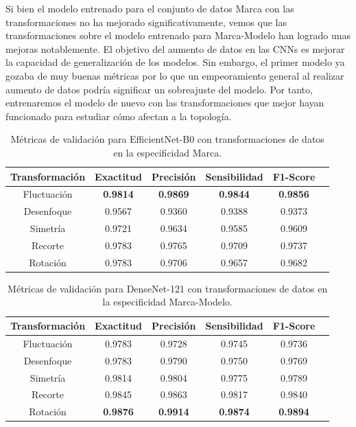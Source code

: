 Si bien el modelo entrenado para el conjunto de datos Marca con las transformaciones no ha mejorado significativamente, vemos que las transformaciones sobre el modelo entrenado para Marca-Modelo han logrado unas mejoras notablemente. El objetivo del aumento de datos en las CNNs es mejorar la capacidad de generalización de los modelos. Sin embargo, el primer modelo ya gozaba de muy buenas métricas por lo que un empeoramiento general al realizar aumento de datos podría significar un sobreajuste del modelo. Por tanto, entrenaremos el modelo de nuevo con las transformaciones que mejor hayan funcionado para estudiar cómo afectan a la topología.

\begin{table}[H]
	\centering
	\begin{adjustbox}{width=0.8\textwidth}
	\begin{tabular}{|c|c|c|c|c|c|}
		\hline
		\textbf{Transformación} & \textbf{Exactitud} & \textbf{Precisión} & \textbf{Sensibilidad} & \textbf{F1-Score} \\
		\hline
		Fluctuación & \textbf{0.9814} & \textbf{0.9869} & \textbf{0.9844} & \textbf{0.9856} \\
		\hline
		Desenfoque & 0.9567 & 0.9360 & 0.9388 & 0.9373 \\
		\hline
		Simetría & 0.9721 & 0.9634 & 0.9585 & 0.9609 \\
		\hline
		Recorte & 0.9783 & 0.9765 & 0.9709 & 0.9737 \\
		\hline
		Rotación & 0.9783 & 0.9706 & 0.9657 & 0.9682 \\
		\hline
	\end{tabular}
\end{adjustbox}
\caption{Métricas de validación para EfficientNet-B0 con transformaciones de datos en la especificidad Marca.}
\label{tab:transformation_metrics-m}
\end{table}

\begin{table}[H]
	\centering
	\begin{adjustbox}{width=0.8\textwidth}
	\begin{tabular}{|c|c|c|c|c|c|}
		\hline
		\textbf{Transformación} & \textbf{Exactitud} & \textbf{Precisión} & \textbf{Sensibilidad} & \textbf{F1-Score} \\
		\hline
		Fluctuación & 0.9783 & 0.9728 & 0.9745 & 0.9736 \\
		\hline
		Desenfoque & 0.9783 & 0.9790 & 0.9750 & 0.9769 \\
		\hline
		Simetría & 0.9814 & 0.9804 & 0.9775 & 0.9789 \\
		\hline
		Recorte & 0.9845 & 0.9863 & 0.9817 & 0.9840 \\
		\hline
		Rotación & \textbf{0.9876} & \textbf{0.9914} & \textbf{0.9874} & \textbf{0.9894} \\
		\hline
	\end{tabular}
\end{adjustbox}
\caption{Métricas de validación para DenseNet-121 con transformaciones de datos en la especificidad Marca-Modelo.}
\label{tab:transformation_metrics-mm}
\end{table}

